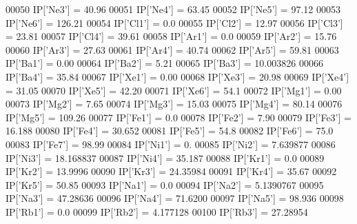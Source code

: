 \begin{DoxyCode}
00050 IP[\textcolor{stringliteral}{'Ne3'}] = 40.96
00051 IP[\textcolor{stringliteral}{'Ne4'}] = 63.45
00052 IP[\textcolor{stringliteral}{'Ne5'}] = 97.12
00053 IP[\textcolor{stringliteral}{'Ne6'}] = 126.21
00054 IP[\textcolor{stringliteral}{'Cl1'}] = 0.0
00055 IP[\textcolor{stringliteral}{'Cl2'}] = 12.97
00056 IP[\textcolor{stringliteral}{'Cl3'}] = 23.81
00057 IP[\textcolor{stringliteral}{'Cl4'}] = 39.61
00058 IP[\textcolor{stringliteral}{'Ar1'}] = 0.0
00059 IP[\textcolor{stringliteral}{'Ar2'}] = 15.76
00060 IP[\textcolor{stringliteral}{'Ar3'}] = 27.63
00061 IP[\textcolor{stringliteral}{'Ar4'}] = 40.74
00062 IP[\textcolor{stringliteral}{'Ar5'}] = 59.81
00063 IP[\textcolor{stringliteral}{'Ba1'}] = 0.00
00064 IP[\textcolor{stringliteral}{'Ba2'}] = 5.21
00065 IP[\textcolor{stringliteral}{'Ba3'}] = 10.003826
00066 IP[\textcolor{stringliteral}{'Ba4'}] = 35.84
00067 IP[\textcolor{stringliteral}{'Xe1'}] = 0.00
00068 IP[\textcolor{stringliteral}{'Xe3'}] = 20.98
00069 IP[\textcolor{stringliteral}{'Xe4'}] = 31.05
00070 IP[\textcolor{stringliteral}{'Xe5'}] = 42.20
00071 IP[\textcolor{stringliteral}{'Xe6'}] = 54.1
00072 IP[\textcolor{stringliteral}{'Mg1'}] = 0.00
00073 IP[\textcolor{stringliteral}{'Mg2'}] = 7.65
00074 IP[\textcolor{stringliteral}{'Mg3'}] = 15.03
00075 IP[\textcolor{stringliteral}{'Mg4'}] = 80.14
00076 IP[\textcolor{stringliteral}{'Mg5'}] = 109.26
00077 IP[\textcolor{stringliteral}{'Fe1'}] = 0.0
00078 IP[\textcolor{stringliteral}{'Fe2'}] = 7.90 
00079 IP[\textcolor{stringliteral}{'Fe3'}] = 16.188
00080 IP[\textcolor{stringliteral}{'Fe4'}] = 30.652
00081 IP[\textcolor{stringliteral}{'Fe5'}] = 54.8
00082 IP[\textcolor{stringliteral}{'Fe6'}] = 75.0
00083 IP[\textcolor{stringliteral}{'Fe7'}] = 98.99
00084 IP[\textcolor{stringliteral}{'Ni1'}] = 0.
00085 IP[\textcolor{stringliteral}{'Ni2'}] = 7.639877
00086 IP[\textcolor{stringliteral}{'Ni3'}] = 18.168837
00087 IP[\textcolor{stringliteral}{'Ni4'}] = 35.187
00088 IP[\textcolor{stringliteral}{'Kr1'}] = 0.0
00089 IP[\textcolor{stringliteral}{'Kr2'}] = 13.9996
00090 IP[\textcolor{stringliteral}{'Kr3'}] = 24.35984
00091 IP[\textcolor{stringliteral}{'Kr4'}] = 35.67
00092 IP[\textcolor{stringliteral}{'Kr5'}] = 50.85
00093 IP[\textcolor{stringliteral}{'Na1'}] = 0.0
00094 IP[\textcolor{stringliteral}{'Na2'}] = 5.1390767
00095 IP[\textcolor{stringliteral}{'Na3'}] = 47.28636
00096 IP[\textcolor{stringliteral}{'Na4'}] = 71.6200
00097 IP[\textcolor{stringliteral}{'Na5'}] = 98.936
00098 IP[\textcolor{stringliteral}{'Rb1'}] = 0.0
00099 IP[\textcolor{stringliteral}{'Rb2'}] = 4.177128
00100 IP[\textcolor{stringliteral}{'Rb3'}] = 27.28954

\end{DoxyCode}
